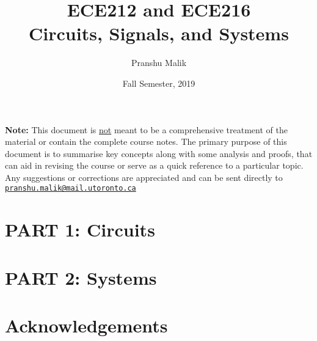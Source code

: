 \documentclass[10pt]{article}
\date{Fall Semester, 2019}
\begin{document}
\title{\textbf{\Large{\textsc{ECE212} and \textsc{ECE216}}} \\ \Large{Circuits, Signals, and Systems}\vspace{-0.3cm}}
\author{Pranshu Malik}

\maketitle
\tableofcontents
\blfootnote
{
    \textbf{Note:} This document is \underline{not} meant to be a comprehensive treatment of the material 
    or contain the complete course notes. The primary purpose of this document is to summarise key concepts
    along with some analysis and proofs, that can aid in revising the course or serve as a quick reference 
    to a particular topic. Any suggestions or corrections are appreciated and can be
    sent directly to \texttt{\href{mailto:pranshu.malik@mail.utoronto.ca}{pranshu.malik@mail.utoronto.ca}}
}

\section*{PART 1: Circuits}
\section*{PART 2: Systems}

\section{Acknowledgements}
\end{document}
